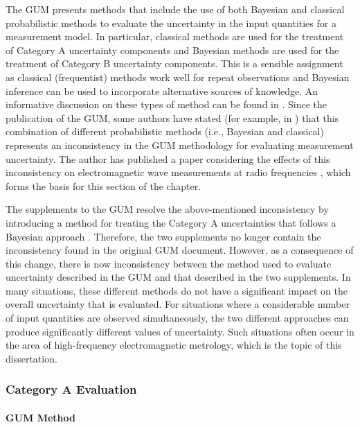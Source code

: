 \documentclass[../thesis/thesis.tex]{subfiles}
\begin{document}
\begin{refsection}
The GUM presents methods that include the use of both Bayesian and classical probabilistic methods to evaluate the uncertainty in the input quantities for a measurement model. In particular, classical methods \cite{Neyman_1937} are used for the treatment of Category A uncertainty components and Bayesian methods \cite{Gelman_2013} are used for the treatment of Category B uncertainty components. This is a sensible assignment as classical (frequentist) methods work well for repeat observations and Bayesian inference can be used to incorporate alternative sources of knowledge. An informative discussion on these types of method can be found in \cite{White_2016}. Since the publication of the GUM, some authors have stated (for example, in \cite{Kacker_2006,Kacker_2005,Kacker_2003,Bich_2014}) that this combination of different probabilistic methods (i.e., Bayesian and classical) represents an inconsistency in the GUM methodology for evaluating measurement uncertainty. The author has published a paper considering the effects of this inconsistency on electromagnetic wave measurements at radio frequencies \cite{Stant_2016}, which forms the basis for this section of the chapter.

The supplements to the GUM \cite{GUM_S1,GUM_S2} resolve the above-mentioned inconsistency by introducing a method for treating the Category A uncertainties that follows a Bayesian approach \cite{Elster_2007}. Therefore, the two supplements no longer contain the inconsistency found in the original GUM document. However, as a consequence of this change, there is now inconsistency between the method used to evaluate uncertainty described in the GUM and that described in the two supplements. In many situations, these different methods do not have a significant impact on the overall uncertainty that is evaluated. For situations where a considerable number of input quantities are observed simultaneously, the two different approaches can produce significantly different values of uncertainty. Such situations often occur in the area of high-frequency electromagnetic metrology, which is the topic of this dissertation.

\subsubsection{Category A Evaluation}

\paragraph{GUM Method}


\end{refsection}
\end{document}
